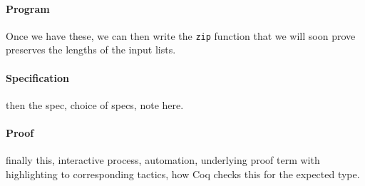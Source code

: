 \paragraph{Program}
Once we have these, we can then write the \lstinline{zip} function that we will soon prove preserves the lengths of the input lists.

\paragraph{Specification}
then the spec, choice of specs, note here.

\paragraph{Proof}
finally this, interactive process, automation, underlying proof term with highlighting to corresponding tactics,
how Coq checks this for the expected type.

